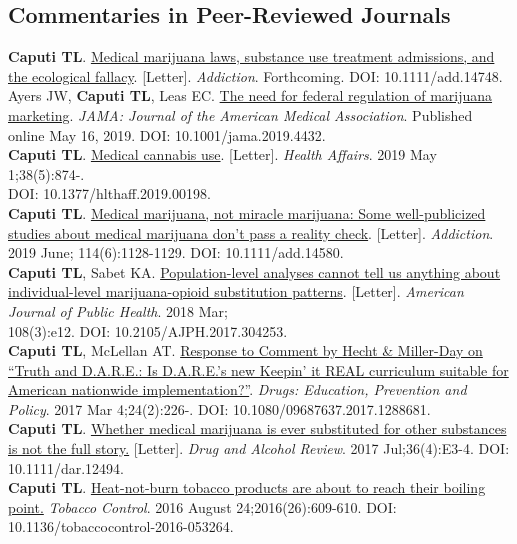 \documentclass[10pt, letterpaper]{article}
\newcommand{\years}[1]{\marginnote{\normalsize #1}}
\begin{document}
\subsection*{Commentaries in Peer-Reviewed Journals}
\years{2019}\textbf{Caputi TL}. \href{http://dx.doi.org/10.1111/add.14748}{Medical marijuana laws, substance use treatment admissions, and the ecological fallacy}. [Letter]. \textit{Addiction}. Forthcoming. DOI: 10.1111/add.14748.\\[.2cm]
\years{2019}Ayers JW, \textbf{Caputi TL}, Leas EC. \href{http://dx.doi.org/10.1001/jama.2019.4432}{The need for federal regulation of marijuana marketing}. \textit{JAMA: Journal of the American Medical Association}. Published online May 16, 2019. DOI: 10.1001/jama.2019.4432.\\[.2cm]
\years{2019}\textbf{Caputi TL}. \href{http://dx.doi.org/10.1377/hlthaff.2019.00198}{Medical cannabis use}. [Letter]. \emph{Health Affairs}. 2019 May 1;38(5):874-.\\DOI: 10.1377/hlthaff.2019.00198.\\[.2cm]
\years{2019}\textbf{Caputi TL}. \href{http://dx.doi.org/10.1111/add.14580}{Medical marijuana, not miracle marijuana: Some well-publicized studies about medical marijuana don't pass a reality check}. [Letter]. \emph{Addiction}. 2019 June; 114(6):1128-1129. DOI: 10.1111/add.14580.\\[.2cm]
\years{2018}\textbf{Caputi TL}, Sabet KA. \href{http://dx.doi.org/10.2105/AJPH.2017.304253}{Population-level analyses cannot tell us anything about individual-level marijuana-opioid substitution patterns}.  [Letter]. \emph{American Journal of Public Health}. 2018 Mar;\\108(3):e12. DOI: 10.2105/AJPH.2017.304253.\\[.2cm]
\years{2017}\textbf{Caputi TL}, McLellan AT.  \href{http://dx.doi.org/10.1080/09687637.2017.1288681}{Response to Comment by Hecht \& Miller-Day on “Truth and D.A.R.E.: Is D.A.R.E.’s new Keepin’ it REAL curriculum suitable for American nationwide implementation?”}. \textit{Drugs: Education, Prevention and Policy}. 2017 Mar 4;24(2):226-. DOI: 10.1080/09687637.2017.1288681.\\[.2cm]
\years{2016}\textbf{Caputi TL}.  \href{http://dx.doi.org/10.1111/dar.12494}{Whether medical marijuana is ever substituted for other substances is not the full story.} [Letter]. \textit{Drug and Alcohol Review}. 2017 Jul;36(4):E3-4. DOI: 10.1111/dar.12494.\\[.2cm]
\years{2016}\textbf{Caputi TL}.  \href{http://dx.doi.org/10.1136/tobaccocontrol-2016-053264}{Heat-not-burn tobacco products are about to reach their boiling point.} \textit{Tobacco Control}. 2016 August 24;2016(26):609-610. DOI: 10.1136/tobaccocontrol-2016-053264.\\[.2cm]
\end{document}
